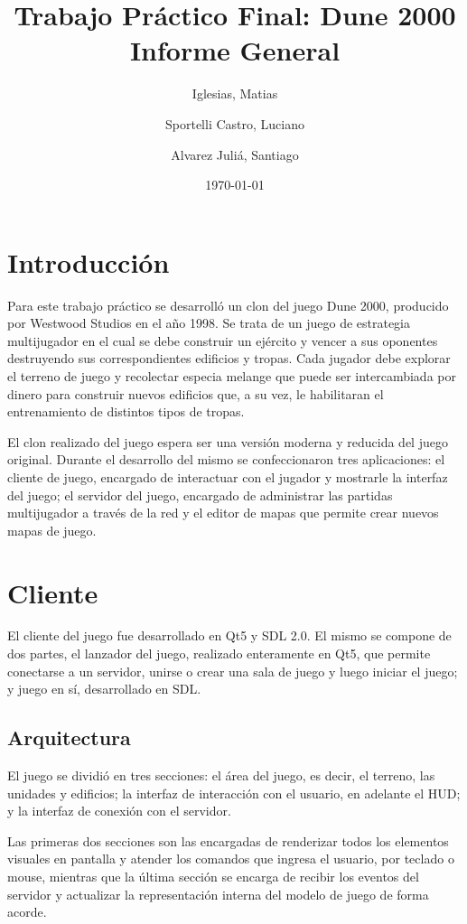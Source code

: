 \documentclass[titlepage,a4paper,12pt]{article}
\title{ Trabajo Práctico Final: Dune 2000 \\
 \large{Informe General}}
\author{Iglesias, Matias \and Sportelli Castro, Luciano \and Alvarez Juliá, Santiago}
\date{ \today }
\begin{document}
\maketitle

\tableofcontents %

\newpage
\section{Introducción}
Para este trabajo práctico se desarrolló un clon del juego Dune 2000, producido por Westwood Studios en el año 1998. Se trata de un juego de estrategia multijugador en el cual se debe construir un ejército y vencer a sus oponentes destruyendo sus correspondientes edificios y tropas.
Cada jugador debe explorar el terreno de juego y recolectar especia melange que puede ser intercambiada por dinero para construir nuevos edificios que, a su vez, le habilitaran el entrenamiento de distintos tipos de tropas.

El clon realizado del juego espera ser una versión moderna y reducida del juego original. Durante el desarrollo del mismo se confeccionaron tres aplicaciones: el cliente de juego, encargado de interactuar con el jugador y mostrarle la interfaz del juego; el servidor del juego, encargado de administrar las partidas multijugador a través de la red y el editor de mapas que permite crear nuevos mapas de juego.

\section{Cliente}
El cliente del juego fue desarrollado en Qt5 y SDL 2.0. El mismo se compone de dos partes, el lanzador del juego, realizado enteramente en Qt5, que permite conectarse a un servidor, unirse o crear una sala de juego y luego iniciar el juego; y juego en sí, desarrollado en SDL.

\subsection{Arquitectura}
El juego se dividió en tres secciones: el área del juego, es decir, el terreno, las unidades y edificios; la interfaz de interacción con el usuario, en adelante el HUD; y la interfaz de conexión con el servidor.

Las primeras dos secciones son las encargadas de renderizar todos los elementos visuales en pantalla y atender los comandos que ingresa el usuario, por teclado o mouse, mientras que la última sección se encarga de recibir los eventos del servidor y actualizar la representación interna del modelo de juego de forma acorde.
\end{document}
